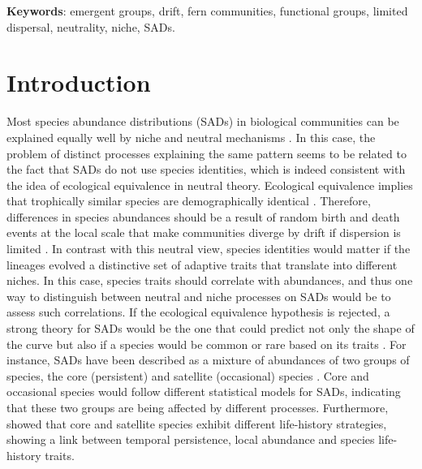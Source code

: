 \documentclass[12pt]{article}
\begin{document}


{\bf Keywords}: emergent groups, drift, fern communities, functional groups, limited dispersal, neutrality, niche, SADs.

\newpage

\section*{Introduction}

Most species abundance distributions (SADs) in biological communities can be explained equally well by niche and neutral mechanisms \citep{McGill2007}. 
In this case, the problem of distinct processes explaining the same pattern seems to be related to the fact that SADs do not use species identities, which is indeed consistent with the idea of ecological equivalence in neutral theory. Ecological equivalence implies that trophically similar species are demographically identical \citep{Hubbell2001, Hubbell2005}. Therefore, differences in species abundances should be a result of random birth and death events at the local scale that make communities diverge by drift if dispersion is limited \citep{Hubbell2001, Hubbell2005}. 
In contrast with this neutral view, species identities would matter if the lineages evolved a distinctive set of adaptive traits that translate into different niches. In this case, species traits should correlate with abundances, and thus one way to distinguish between neutral and niche processes on SADs would be to assess such correlations. 
If the ecological equivalence hypothesis is rejected, a strong theory for SADs would be the one that could predict not only the shape of the curve but also if a species would be common or rare based on its traits \citep{Mcgill2003}. 
For instance, SADs have been described as a mixture of abundances of two groups of species, the core (persistent) and satellite (occasional) species \citep{Magurran2003}.
Core and occasional species would follow different statistical models for SADs, indicating that these two groups are being affected by different processes. Furthermore, \cite{Supp2015} showed that core and satellite species exhibit different life-history strategies, showing a link between temporal persistence, local abundance and species life-history traits.
\end{document}
